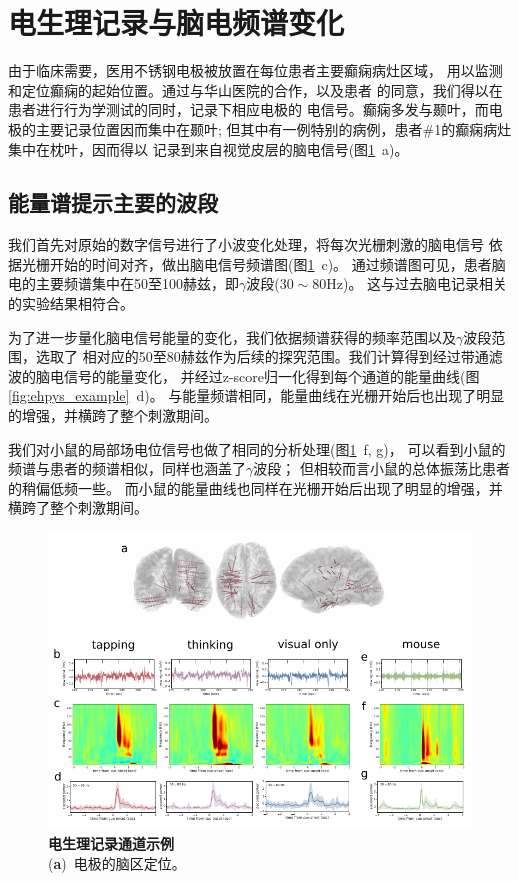 
\section{电生理记录与脑电频谱变化}
由于临床需要，医用不锈钢电极被放置在每位患者主要癫痫病灶区域，
用以监测和定位癫痫的起始位置。通过与华山医院的合作，以及患者
的同意，我们得以在患者进行行为学测试的同时，记录下相应电极的
电信号。癫痫多发与颞叶，而电极的主要记录位置因而集中在颞叶;
但其中有一例特别的病例，患者\#1的癫痫病灶集中在枕叶，因而得以
记录到来自视觉皮层的脑电信号(图\ref{fig:ephys_example}~a)。

\subsection{能量谱提示主要的波段}
我们首先对原始的数字信号进行了小波变化处理，将每次光栅刺激的脑电信号
依据光栅开始的时间对齐，做出脑电信号频谱图(图\ref{fig:ephys_example}~c)。
通过频谱图可见，患者脑电的主要频谱集中在50至100赫兹，即\(\gamma\)波段(\(30 \sim 80 \text{Hz}\))。
这与过去脑电记录相关的实验结果相符合\cite{todo}。%

为了进一步量化脑电信号能量的变化，我们依据频谱获得的频率范围以及\(\gamma\)波段范围，选取了
相对应的50至80赫兹作为后续的探究范围。我们计算得到经过带通滤波的脑电信号的能量变化，
并经过z-score归一化得到每个通道的能量曲线(图\ref{fig:ehpys_example}~d)。
与能量频谱相同，能量曲线在光栅开始后也出现了明显的增强，并横跨了整个刺激期间。

我们对小鼠的局部场电位信号也做了相同的分析处理(图\ref{fig:ephys_example}~f, g)，
可以看到小鼠的频谱与患者的频谱相似，同样也涵盖了\(\gamma\)波段；
但相较而言小鼠的总体振荡比患者的稍偏低频一些。
而小鼠的能量曲线也同样在光栅开始后出现了明显的增强，并横跨了整个刺激期间。

\begin{figure}[h]
    \centering
    \includegraphics[width=\textwidth]{src/figures/ephys_examples.pdf}
    \caption{\textbf{电生理记录通道示例}\\
    (\textbf{a})~电极的脑区定位。}
    \label{fig:ephys_example}
\end{figure}

